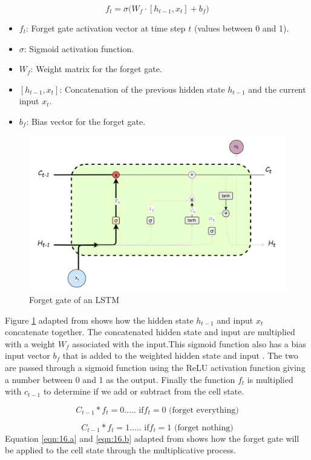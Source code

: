 \[
f_t = \sigma \Big( W_f \cdot [h_{t-1}, x_t] + b_f \Big)
\tag{15}
\label{eqn:15}
\]

\begin{itemize}
	\item $f_t$: Forget gate activation vector at time step $t$ (values between 0 and 1).
	\item $\sigma$: Sigmoid activation function.
	\item $W_f$: Weight matrix for the forget gate.
	\item $[h_{t-1}, x_t]$: Concatenation of the previous hidden state $h_{t-1}$ and the current input $x_t$.
	\item $b_f$: Bias vector for the forget gate.
\end{itemize}
\begin{figure}[h]
	\centering
	\includegraphics[width=0.7\linewidth]{"Chapters/images/LSTM input gate"}
	\caption{Forget gate of an LSTM}
	\label{fig:forgetgate}
\end{figure}
Figure \ref{fig:forgetgate} adapted from \cite{colah2015understanding} shows how the hidden state $h_{t-1}$ and input $x_t$ concatenate together. The concatenated hidden state and input are multiplied with a weight $W_f$ associated with the input.This sigmoid function also has a bias input vector $b_f$ that is added to the weighted hidden state and input .  The two are passed through a sigmoid function using the ReLU activation function giving a number between 0 and 1 as the output. Finally the function $f_t$ is multiplied with $c_{t-1}$ to determine if we add or subtract from the cell state.

\[
C_{t-1}*f_t = 0   ..... \text{    if} f_t = 0 \text{           (forget everything)}
\tag{16.a}
\label{eqn:16.a}
\]

\[
C_{t-1}*f_t = 1  ..... \text{  if} f_t = 1 \text{            (forget nothing)}
\tag{16.b}
\label{eqn:16.b}
\]
 Equation \ref{eqn:16.a} and \ref{eqn:16.b} adapted from \cite{stryker_ibm_rnn} shows how the forget gate will be applied to the cell state through the multiplicative process.
 
